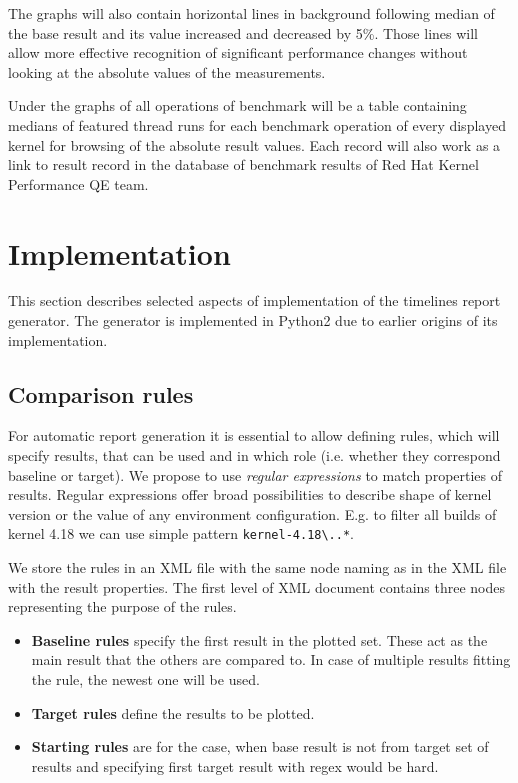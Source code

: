The graphs will also contain horizontal lines in background following median of the
base result and its value increased and decreased by 5\%. Those lines will allow
more effective recognition of significant performance changes without looking at
the absolute values of the measurements.

Under the graphs of all operations of benchmark will be a table containing medians
of featured thread runs for each benchmark operation of every displayed kernel
for browsing of the absolute result values. Each record will also work as a link
to result record in the database of benchmark results of Red Hat Kernel
Performance QE team.

\section{Implementation}
This section describes selected aspects of implementation of the timelines
report generator. The generator is implemented in Python2 due to earlier origins
of its implementation.

\subsection{Comparison rules}
For automatic report generation it is essential to allow defining rules, which
will specify results, that can be used and in which role (i.e. whether they
correspond baseline or target). We propose to use \emph{regular expressions} to
match properties of results. Regular expressions offer broad possibilities to
describe shape of kernel version or the value of any environment configuration.
E.g. to filter all builds of kernel 4.18 we can use simple pattern
\texttt{kernel-4.18\textbackslash ..*}.

We store the rules in an XML file with the same node naming as in the XML file
with the result properties. The first level of XML document contains three nodes
representing the purpose of the rules.
\begin{itemize}
  \item \textbf{Baseline rules} specify the first result in the plotted set.
    These act as the main result that the others are compared to. In case of
    multiple results fitting the rule, the newest one will be used.
  \item \textbf{Target rules} define the results to be plotted.
  \item \textbf{Starting rules} are for the case, when base result is not from
    target set of results and specifying first target result with regex would be
    hard.
  \end{itemize}

